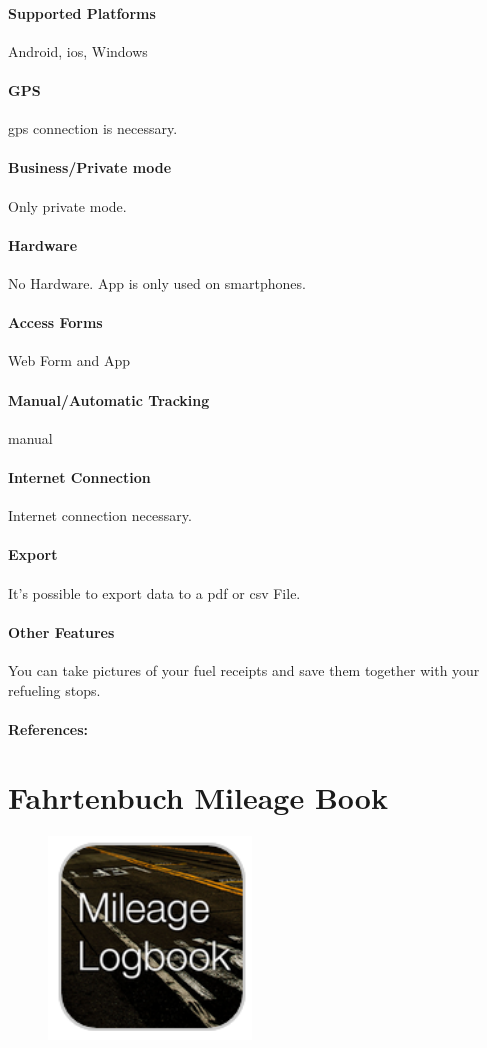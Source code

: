 \paragraph{Supported Platforms} Android, \gls{ios}, Windows
\paragraph{GPS} \gls{gps} connection is necessary.
\paragraph{Business/Private mode} Only private mode.
\paragraph{Hardware} No Hardware. App is only used on smartphones.
\paragraph{Access Forms}Web Form and App
\paragraph{Manual/Automatic Tracking} manual
\paragraph{Internet Connection} Internet connection necessary.
\paragraph{Export} It’s possible to export data to a \gls{pdf} or \gls{csv} File.
\paragraph{Other Features} You can take pictures of your fuel receipts and save them together with your refueling stops.
\paragraph{References:} \cite{Carpanion}
\newpage

\section{Fahrtenbuch Mileage Book}
\begin{figure}
  \begin{center}
    \includegraphics[width=0.48\textwidth]{bilder/mileage}
  \end{center}
\end{figure}
